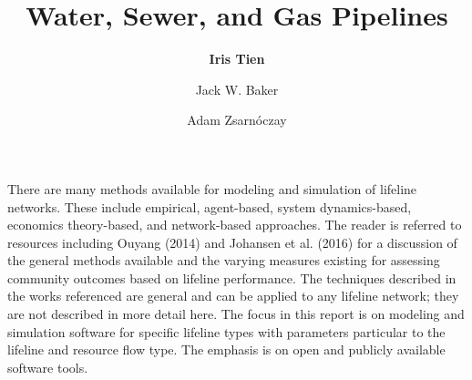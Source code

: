 %
%
%


%
%
%
%
%
%
%
%

\title{Water, Sewer, and Gas Pipelines}
\author{
    \textbf{Iris Tien}
    \and Jack W. Baker
    \and Adam Zsarnóczay}
\tocauthor{}
%
%
\maketitle

There are many methods available for modeling and simulation of lifeline networks. These include empirical, agent-based, system dynamics-based, economics theory-based, and network-based approaches. The reader is referred to resources including Ouyang (2014) and Johansen et al. (2016) for a discussion of the general methods available and the varying measures existing for assessing community outcomes based on lifeline performance. The techniques described in the works referenced are general and can be applied to any lifeline network; they are not described in more detail here. The focus in this report is on modeling and simulation software for specific lifeline types with parameters particular to the lifeline and resource flow type. The emphasis is on open and publicly available software tools.

